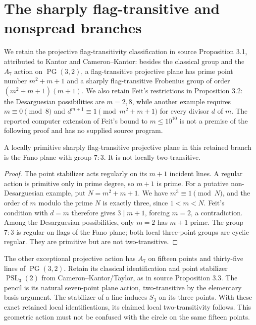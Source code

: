 \section{The sharply flag-transitive and nonspread branches}
We retain the projective flag-transitivity classification in source
Proposition 3.1, attributed to Kantor and Cameron--Kantor: besides the
classical group and the $A_7$ action on $\operatorname{PG}(3,2)$, a
flag-transitive projective plane has prime point number $m^2+m+1$ and
a sharply flag-transitive Frobenius group of order
$(m^2+m+1)(m+1)$. We also retain Feit's restrictions in Proposition 3.2:
the Desarguesian possibilities are $m=2,8$, while another example
requires $m\equiv0\pmod8$ and
$d^{m+1}\equiv1\pmod{m^2+m+1}$ for every divisor $d$ of $m$.
The reported computer extension of Feit's bound to $m\le10^{10}$ is
not a premise of the following proof and has no supplied source program.

\begin{proposition}\label{projectivefrobenius}
A locally primitive sharply flag-transitive projective plane in this
retained branch is the Fano plane with group $7:3$. It is not locally
two-transitive.
\end{proposition}
\begin{proof}
The point stabilizer acts regularly on its $m+1$ incident lines.
A regular action is primitive only in prime degree, so $m+1$ is
prime. For a putative non-Desarguesian example, put $N=m^2+m+1$.
We have $m^3\equiv1\pmod N$, and the order of $m$ modulo the prime
$N$ is exactly three, since $1<m<N$. Feit's condition with $d=m$
therefore gives $3\mid m+1$, forcing $m=2$, a contradiction.
Among the Desarguesian possibilities, only $m=2$ has $m+1$ prime.
The group $7:3$ is regular on flags of the Fano plane; both local
three-point groups are cyclic regular. They are primitive but are
not two-transitive.
\end{proof}

The other exceptional projective action has $A_7$ on fifteen points
and thirty-five lines of $\operatorname{PG}(3,2)$. Retain its classical
identification and point stabilizer $\operatorname{PSL}_3(2)$ from
Cameron--Kantor/Taylor, as in source Proposition 3.3. The pencil is its
natural seven-point plane action, two-transitive by the elementary
basis argument. The stabilizer of a line induces $S_3$ on its three
points. With these exact retained local identifications, its claimed
local two-transitivity follows. This geometric action must not be
confused with the circle on the same fifteen points.

